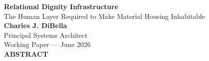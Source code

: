 \documentclass[12pt, letterpaper]{article}
\begin{document}
\begin{titlepage}
\begin{center}
{\LARGE \textbf{Relational Dignity Infrastructure}}\\[6pt]
{\large The Human Layer Required to Make Material Housing Inhabitable}\\[0.5cm]
{\normalsize \textbf{Charles J. DiBella}}\\[0.01cm]
{\normalsize Principal Systems Architect}\\[0.01cm]
{\normalsize Working Paper --- June 2026}\\[0.3cm]
\textbf{ABSTRACT}
\vspace{0.2cm}
\end{center}
\begin{minipage}{0.95\textwidth}
\noindent


\end{minipage}
\end{titlepage}
\end{document}
